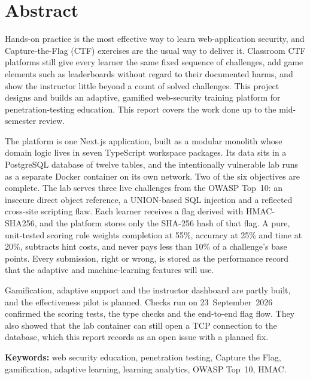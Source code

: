 \chapter*{Abstract}

Hands-on practice is the most effective way to learn web-application security, and Capture-the-Flag (CTF) exercises are the usual way to deliver it. Classroom CTF platforms still give every learner the same fixed sequence of challenges, add game elements such as leaderboards without regard to their documented harms, and show the instructor little beyond a count of solved challenges. This project designs and builds an adaptive, gamified web-security training platform for penetration-testing education. This report covers the work done up to the mid-semester review.

The platform is one Next.js application, built as a modular monolith whose domain logic lives in seven TypeScript workspace packages. Its data sits in a PostgreSQL database of twelve tables, and the intentionally vulnerable lab runs as a separate Docker container on its own network. Two of the six objectives are complete. The lab serves three live challenges from the OWASP Top~10: an insecure direct object reference, a UNION-based SQL injection and a reflected cross-site scripting flaw. Each learner receives a flag derived with HMAC-SHA256, and the platform stores only the SHA-256 hash of that flag. A pure, unit-tested scoring rule weights completion at 55\%, accuracy at 25\% and time at 20\%, subtracts hint costs, and never pays less than 10\% of a challenge's base points. Every submission, right or wrong, is stored as the performance record that the adaptive and machine-learning features will use.

Gamification, adaptive support and the instructor dashboard are partly built, and the effectiveness pilot is planned. Checks run on 23~September~2026 confirmed the scoring tests, the type checks and the end-to-end flag flow. They also showed that the lab container can still open a TCP connection to the database, which this report records as an open issue with a planned fix.

\vspace{0.8em}
\noindent\textbf{Keywords:} web security education, penetration testing, Capture the Flag, gamification, adaptive learning, learning analytics, OWASP Top~10, HMAC.
